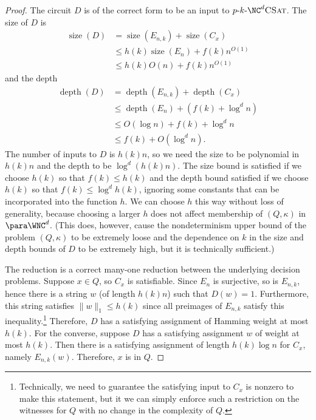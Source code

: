 \documentclass{article}
\newcommand{\dash}{\textnormal{-}}
\newcommand{\pNCSAT}{p \dash k \dash \NC^d \textsc{CSat}}
\DeclareMathOperator{\depth}{depth}
\DeclareMathOperator{\size}{size}
\begin{document}
\begin{proof}
  The circuit $D$ is of the correct form to be an input to $\pNCSAT$.
  The size of $D$ is
  \begin{align*}
    \size(D) & = \size(E_{n, k}) + \size(C_x) \\
    & \leq h(k) \size(E_n) + f(k) n^{O(1)} \\
    & \leq h(k) O(n) + f(k) n^{O(1)}
  \end{align*}
  and the depth
  \begin{align*}
    \depth(D) & = \depth(E_{n, k}) + \depth(C_x) \\
    & \leq \depth(E_n) + (f(k) + \log^d n) \\
    & \leq O(\log n) + f(k) + \log^d n \\
    & \leq f(k) + O(\log^d n).
  \end{align*}
  The number of inputs to $D$ is $h(k) n$, so we need the size to be polynomial in $h(k) n$ and the depth to be $\log^d (h(k) n)$.
  The size bound is satisfied if we choose $h(k)$ so that $f(k) \leq h(k)$ and the depth bound satisfied if we choose $h(k)$ so that $f(k) \leq \log^d h(k)$, ignoring some constants that can be incorporated into the function $h$.
  We can choose $h$ this way without loss of generality, because choosing a larger $h$ does not affect membership of $(Q, \kappa)$ in $\para \WNC^d$.
  (This does, however, cause the nondeterminism upper bound of the problem $(Q, \kappa)$ to be extremely loose and the dependence on $k$ in the size and depth bounds of $D$ to be extremely high, but it is technically sufficient.)

  The reduction is a correct many-one reduction between the underlying decision problems.
  Suppose $x \in Q$, so $C_x$ is satisfiable.
  Since $E_n$ is surjective, so is $E_{n, k}$, hence there is a string $w$ (of length $h(k) n$) such that $D(w) = 1$.
  Furthermore, this string satisfies $\|w\|_1 \leq h(k)$ since all preimages of $E_{n, k}$ satisfy this inequality.\footnote{%
    Technically, we need to guarantee the satisfying input to $C_x$ is nonzero to make this statement, but it we can simply enforce such a restriction on the witnesses for $Q$ with no change in the complexity of $Q$.}
  Therefore, $D$ has a satisfying assignment of Hamming weight at most $h(k)$.
  For the converse, suppose $D$ has a satisfying assignment $w$ of weight at most $h(k)$.
  Then there is a satisfying assignment of length $h(k) \log n$ for $C_x$, namely $E_{n, k}(w)$.
  Therefore, $x$ is in $Q$.


\end{proof}
\end{document}

